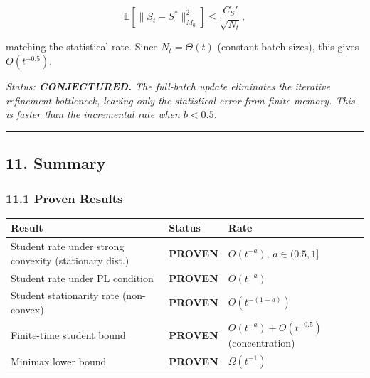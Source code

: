 \documentclass[
  12pt,
]{ctexart}
\begin{document}
\[\mathbb{E}[\|S_t - S^*\|_{M_0}^2] \leq \frac{C_S'}{\sqrt{N_t}},\]

matching the statistical rate. Since \(N_t = \Theta(t)\) (constant batch
sizes), this gives \(O(t^{-0.5})\).

\emph{Status: \textbf{CONJECTURED.} The full-batch update eliminates the
iterative refinement bottleneck, leaving only the statistical error from
finite memory. This is faster than the incremental rate when
\(b < 0.5\).}

\begin{center}\rule{0.5\linewidth}{0.5pt}\end{center}

\subsection{11. Summary}\label{summary}

\subsubsection{11.1 Proven Results}\label{proven-results}

\begin{longtable}[]{@{}
  >{\raggedright\arraybackslash}p{}
  >{\raggedright\arraybackslash}p{}
  >{\raggedright\arraybackslash}p{}@{}}
\toprule\noalign{}
\begin{minipage}[b]{\linewidth}\raggedright
Result
\end{minipage} & \begin{minipage}[b]{\linewidth}\raggedright
Status
\end{minipage} & \begin{minipage}[b]{\linewidth}\raggedright
Rate
\end{minipage} \\
\midrule\noalign{}
\endhead
\bottomrule\noalign{}
\endlastfoot
Student rate under strong convexity (stationary dist.) & \textbf{PROVEN}
& \(O(t^{-a})\), \(a \in (0.5, 1]\) \\
Student rate under PL condition & \textbf{PROVEN} & \(O(t^{-a})\) \\
Student stationarity rate (non-convex) & \textbf{PROVEN} &
\(O(t^{-(1-a)})\) \\
Finite-time student bound & \textbf{PROVEN} &
\(O(t^{-a}) + O(t^{-0.5})\) (concentration) \\
Minimax lower bound & \textbf{PROVEN} & \(\Omega(t^{-1})\) \\
\end{longtable}
\end{document}
